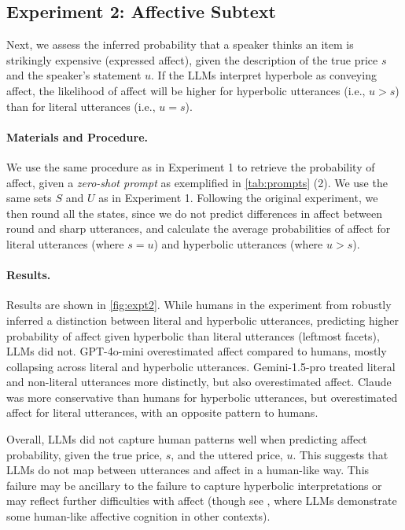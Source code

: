 \subsection{Experiment 2: Affective Subtext}
Next, we assess the inferred probability that a speaker thinks an item is strikingly expensive (\ie expressed affect), given the description of the true price $s$ and the speaker's statement $u$. If the LLMs interpret hyperbole as conveying affect, the likelihood of affect will be higher for hyperbolic utterances (i.e., $u > s$) than for literal utterances (i.e., $u = s$).

\paragraph{Materials and Procedure.} 
We use the same procedure as in Experiment 1 to retrieve the probability of affect, given a \textit{zero-shot prompt} as exemplified in \autoref{tab:prompts} (2). We use the same sets $S$ and $U$ as in Experiment 1.
Following the original experiment, we then round all the states, since we do not predict differences in affect between round and sharp utterances, and calculate the average probabilities of affect for literal utterances (where $s=u$) and hyperbolic utterances (where $u > s$). %

\paragraph{Results.}
Results are shown in \autoref{fig:expt2}. While humans in the experiment from \citet{kao2014nonliteral} robustly inferred a distinction between literal and hyperbolic utterances, predicting higher probability of affect given hyperbolic than literal utterances (leftmost facets), LLMs did not. GPT-4o-mini overestimated affect compared to humans, mostly collapsing across literal and hyperbolic utterances. Gemini-1.5-pro treated literal and non-literal utterances more distinctly, but also overestimated affect. Claude was more conservative than humans for hyperbolic utterances, but overestimated affect for literal utterances, with an opposite pattern to humans.

Overall, LLMs did not capture human patterns well when predicting affect probability, given the true price, $s$, and the uttered price, $u$. This suggests that LLMs do not map between utterances and affect in a human-like way. This failure may be ancillary to the failure to capture hyperbolic interpretations or may reflect further difficulties with affect (though see \citet{gandhi2024human}, where LLMs demonstrate some human-like affective cognition in other contexts).

